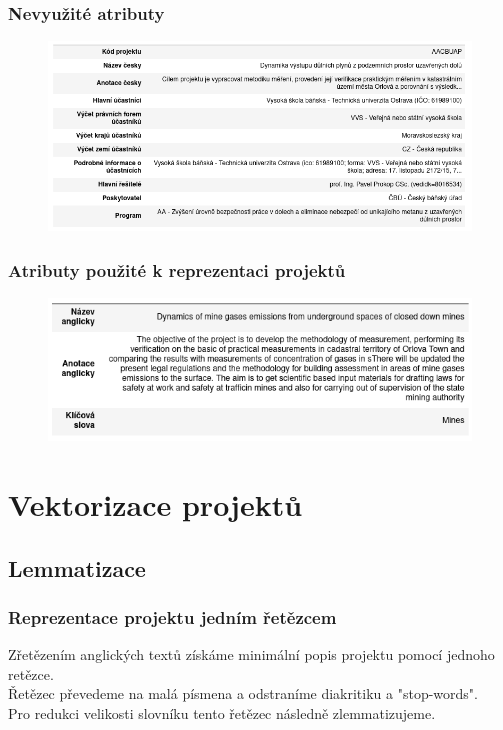 \documentclass{beamer}
\begin{document}
\begin{frame}
\frametitle{Nevyužité atributy}

  \begin{figure}[!h]
      \centering
      \includegraphics[width=.85\textwidth,height=\textheight,keepaspectratio]{figures/unused.png}
      \label{fig:unused}
  \end{figure}

\end{frame}

\begin{frame}
\frametitle{Atributy použité k reprezentaci projektů}

  \begin{figure}[!h]
      \centering
      \includegraphics[width=.7\textwidth,height=\textheight,keepaspectratio]{figures/used.png}
      \label{fig:used}
  \end{figure}

\end{frame}

\section{Vektorizace projektů}
\subsection{Lemmatizace}

\begin{frame}
\frametitle{Reprezentace projektu jedním řetězcem}

  \centering
  Zřetězením anglických textů získáme minimální popis projektu pomocí jednoho retězce. \\ \pause
  \vspace*{\fill}
  Řetězec převedeme na malá písmena a odstraníme diakritiku a "stop-words". \\ \pause
  \vspace*{\fill}
  Pro redukci velikosti slovníku tento řetězec následně zlemmatizujeme. \\

\end{frame}
\end{document}
